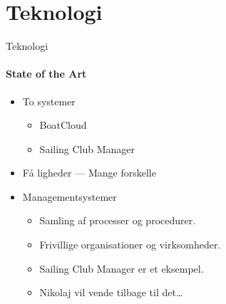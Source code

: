 \section{Teknologi}

\begin{frame}{Teknologi}
  \framesubtitle{State of the Art}
  
  \begin{itemize}
    \item To systemer
    \begin{itemize}
      \item BoatCloud
      \item Sailing Club Manager
    \end{itemize}
    \item Få ligheder --- Mange forskelle
    \vspace{2mm}
    \item Managementsystemer
    \begin{itemize}
      \item Samling af processer og procedurer.
      \item Frivillige organisationer og virksomheder.
      \item Sailing Club Manager er et eksempel.
      \item Nikolaj vil vende tilbage til det\ldots
    \end{itemize}
  \end{itemize}
\end{frame}
